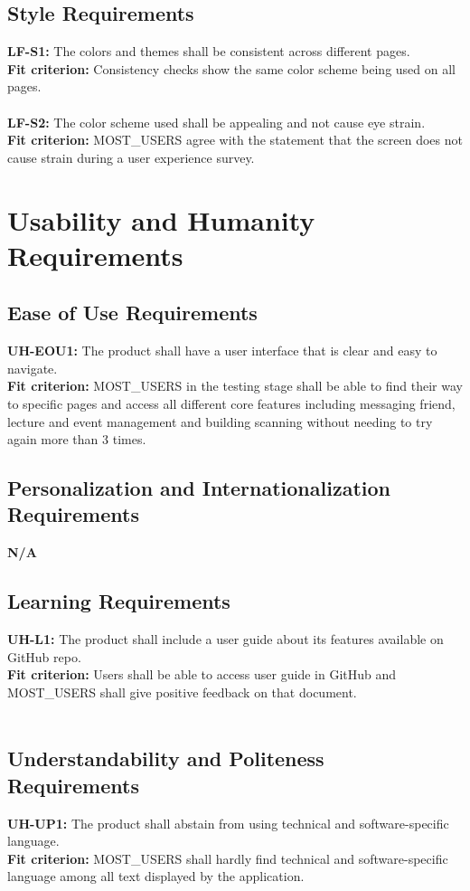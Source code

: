 \documentclass[12pt]{article}
\begin{document}
\subsection{Style Requirements}
  \textbf{LF-S1:} The colors and themes shall be consistent across different pages.\\
  \textbf{Fit criterion:} Consistency checks show the same color scheme being used on all pages.\\\\
  \textbf{LF-S2:} The color scheme used shall be appealing and not cause eye strain.\\
  \textbf{Fit criterion:} MOST\_USERS agree with the statement that the screen does not cause strain during a user experience survey.\\

\section{Usability and Humanity Requirements}
\subsection{Ease of Use Requirements}
  \textbf{UH-EOU1:} The product shall have a user interface that is clear and easy to navigate.\\
  \textbf{Fit criterion:} MOST\_USERS in the testing stage shall be able to find their way to specific pages and access all different core features including messaging friend, lecture and event management and building scanning without needing to try again more than 3 times.\\
\subsection{Personalization and Internationalization Requirements}
  \textbf{N/A}\\
\subsection{Learning Requirements}
  \textbf{UH-L1:} The product shall include a user guide about its features available on GitHub repo.\\
  \textbf{Fit criterion:} Users shall be able to access user guide in GitHub and MOST\_USERS shall give positive feedback on that document.\\\\
\subsection{Understandability and Politeness Requirements}
  \textbf{UH-UP1:} The product shall abstain from using technical and software-specific language.\\
  \textbf{Fit criterion:} MOST\_USERS shall hardly find technical and software-specific language among all text displayed by the application.\\
\end{document}
